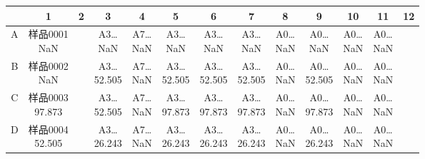 \documentclass[UTF8,10pt,a4paper,fontset=fandol]{ctexart}
\begin{document}
\begin{center}
\scriptsize
\begin{tabular}{c|cccccccccccc}
 & 1 & 2 & 3 & 4 & 5 & 6 & 7 & 8 & 9 & 10 & 11 & 12\\
\hline
A & \shortstack{样品0001\\NaN} & & \shortstack{A3\ldots\\NaN} & \shortstack{A7\ldots\\NaN} & \shortstack{A3\ldots\\NaN} & \shortstack{A3\ldots\\NaN} & \shortstack{A3\ldots\\NaN} & \shortstack{A0\ldots\\NaN} & \shortstack{A0\ldots\\NaN} & \shortstack{A0\ldots\\NaN} & \shortstack{A0\ldots\\NaN} &\\
B & \shortstack{样品0002\\NaN} & & \shortstack{A3\ldots\\52.505} & \shortstack{A7\ldots\\NaN} & \shortstack{A3\ldots\\52.505} & \shortstack{A3\ldots\\52.505} & \shortstack{A3\ldots\\52.505} & \shortstack{A0\ldots\\NaN} & \shortstack{A0\ldots\\52.505} & \shortstack{A0\ldots\\NaN} & \shortstack{A0\ldots\\NaN} &\\
C & \shortstack{样品0003\\97.873} & & \shortstack{A3\ldots\\52.505} & \shortstack{A7\ldots\\NaN} & \shortstack{A3\ldots\\97.873} & \shortstack{A3\ldots\\97.873} & \shortstack{A3\ldots\\97.873} & \shortstack{A0\ldots\\NaN} & \shortstack{A0\ldots\\97.873} & \shortstack{A0\ldots\\NaN} & \shortstack{A0\ldots\\NaN} &\\
D & \shortstack{样品0004\\52.505} & & \shortstack{A3\ldots\\26.243} & \shortstack{A7\ldots\\NaN} & \shortstack{A3\ldots\\26.243} & \shortstack{A3\ldots\\26.243} & \shortstack{A3\ldots\\26.243} & \shortstack{A0\ldots\\NaN} & \shortstack{A0\ldots\\26.243} & \shortstack{A0\ldots\\NaN} & \shortstack{A0\ldots\\NaN} &\\

\end{tabular}
\end{center}
\end{document}
